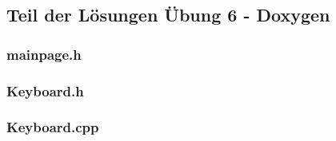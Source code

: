 %
%
%
%

\setcounter{section}{6}
\setcounter{subsection}{1}
%
\newpage
\subsection{Teil der Lösungen Übung 6 - Doxygen}
\subsubsection{mainpage.h}

%
\subsubsection{Keyboard.h}

\subsubsection{Keyboard.cpp}

%
%

